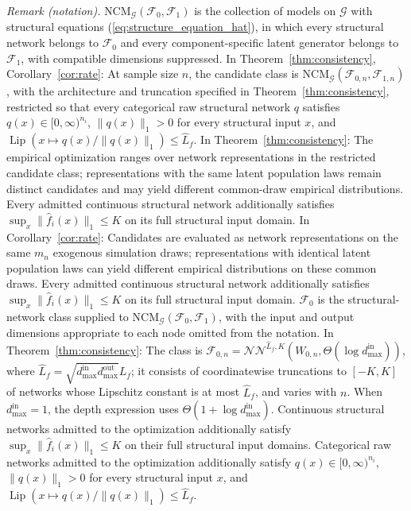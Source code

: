 \noindent\textit{Remark (notation).} $\text{NCM}_{\mathcal{G}}(\mathcal{F}_0,\mathcal{F}_1)$ is the collection of models on $\mathcal{G}$ with structural equations (\ref{eq:structure_equation_hat}), in which every structural network belongs to $\mathcal{F}_0$ and every component-specific latent generator belongs to $\mathcal{F}_1$, with compatible dimensions suppressed. In Theorem~\ref{thm:consistency}, Corollary~\ref{cor:rate}: At sample size $n$, the candidate class is $\text{NCM}_{\mathcal G}(\mathcal F_{0,n},\mathcal F_{1,n})$, with the architecture and truncation specified in Theorem~\ref{thm:consistency}, restricted so that every categorical raw structural network $q$ satisfies $q(x)\in[0,\infty)^{n_i}$, $\|q(x)\|_1>0$ for every structural input $x$, and $\operatorname{Lip}(x\mapsto q(x)/\|q(x)\|_1)\leqslant\hat L_f$. In Theorem~\ref{thm:consistency}: The empirical optimization ranges over network representations in the restricted candidate class; representations with the same latent population laws remain distinct candidates and may yield different common-draw empirical distributions. Every admitted continuous structural network additionally satisfies $\sup_x\|\hat f_i(x)\|_1\leqslant K$ on its full structural input domain. In Corollary~\ref{cor:rate}: Candidates are evaluated as network representations on the same $m_n$ exogenous simulation draws; representations with identical latent population laws can yield different empirical distributions on these common draws. Every admitted continuous structural network additionally satisfies $\sup_x\|\hat f_i(x)\|_1\leqslant K$ on its full structural input domain. $\mathcal{F}_0$ is the structural-network class supplied to $\text{NCM}_{\mathcal{G}}(\mathcal{F}_0,\mathcal{F}_1)$, with the input and output dimensions appropriate to each node omitted from the notation. In Theorem~\ref{thm:consistency}: The class is $\mathcal{F}_{0,n}=\mathcal{NN}^{\hat L_f,K}(W_{0,n},\Theta(\log d_{\max}^{\text{in}}))$, where $\hat L_f=\sqrt{d_{\max}^{\text{in}}d_{\max}^{\text{out}}}L_f$; it consists of coordinatewise truncations to $[-K,K]$ of networks whose Lipschitz constant is at most $\hat L_f$, and varies with $n$. When $d_{\max}^{\text{in}}=1$, the depth expression uses $\Theta(1+\log d_{\max}^{\text{in}})$. Continuous structural networks admitted to the optimization additionally satisfy $\sup_x\|\hat f_i(x)\|_1\leqslant K$ on their full structural input domains. Categorical raw networks admitted to the optimization additionally satisfy $q(x)\in[0,\infty)^{n_i}$, $\|q(x)\|_1>0$ for every structural input $x$, and $\operatorname{Lip}(x\mapsto q(x)/\|q(x)\|_1)\leqslant\hat L_f$.


